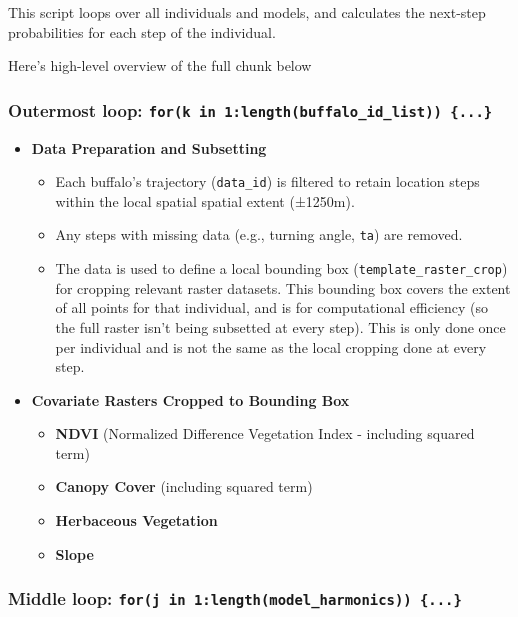 \documentclass[
  letterpaper,
  DIV=11,
  numbers=noendperiod]{scrartcl}
\providecommand{\tightlist}{%
  \setlength{\itemsep}{0pt}\setlength{\parskip}{0pt}}
\begin{document}
This script loops over all individuals and models, and calculates the
next-step probabilities for each step of the individual.

Here's high-level overview of the full chunk below

\subsubsection{\texorpdfstring{Outermost loop:
\texttt{for(k\ in\ 1:length(buffalo\_id\_list))\ \{...\}}}{Outermost loop: for(k in 1:length(buffalo\_id\_list)) \{...\}}}\label{outermost-loop-fork-in-1lengthbuffalo_id_list-...}

\begin{itemize}
\item
  \textbf{Data Preparation and Subsetting}

  \begin{itemize}
  \tightlist
  \item
    Each buffalo's trajectory (\texttt{data\_id}) is filtered to retain
    location steps within the local spatial spatial extent (±1250m).
  \item
    Any steps with missing data (e.g., turning angle, \texttt{ta}) are
    removed.
  \item
    The data is used to define a local bounding box
    (\texttt{template\_raster\_crop}) for cropping relevant raster
    datasets. This bounding box covers the extent of all points for that
    individual, and is for computational efficiency (so the full raster
    isn't being subsetted at every step). This is only done once per
    individual and is not the same as the local cropping done at every
    step.
  \end{itemize}
\item
  \textbf{Covariate Rasters Cropped to Bounding Box}

  \begin{itemize}
  \tightlist
  \item
    \textbf{NDVI} (Normalized Difference Vegetation Index - including
    squared term)
  \item
    \textbf{Canopy Cover} (including squared term)
  \item
    \textbf{Herbaceous Vegetation}
  \item
    \textbf{Slope}
  \end{itemize}
\end{itemize}

\subsubsection{\texorpdfstring{Middle loop:
\texttt{for(j\ in\ 1:length(model\_harmonics))\ \{...\}}}{Middle loop: for(j in 1:length(model\_harmonics)) \{...\}}}\label{middle-loop-forj-in-1lengthmodel_harmonics-...}
\end{document}
